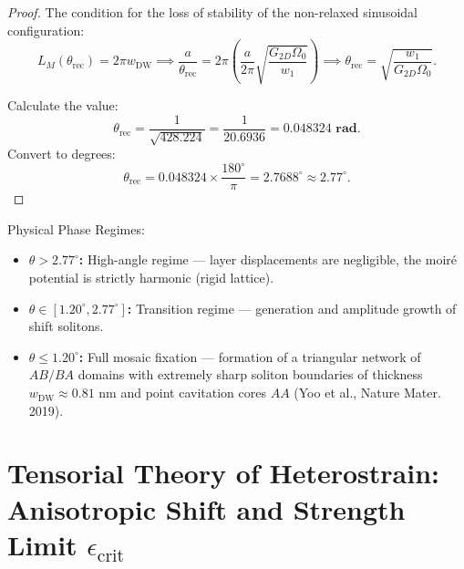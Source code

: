 \documentclass[12pt,a4paper]{article}
\begin{document}
				\begin{proof}
					The condition for the loss of stability of the non-relaxed sinusoidal configuration:
					\begin{equation}
						L_M(\theta_{\text{rec}}) = 2\pi w_{\text{DW}} \implies \frac{a}{\theta_{\text{rec}}} = 2\pi \left( \frac{a}{2\pi} \sqrt{\frac{G_{2D} \Omega_0}{w_1}} \right) \implies \theta_{\text{rec}} = \sqrt{\frac{w_1}{G_{2D} \Omega_0}}.
					\end{equation}
					
					Calculate the value:
					\begin{equation}
						\theta_{\text{rec}} = \frac{1}{\sqrt{428.224}} = \frac{1}{20.6936} = \mathbf{0.048324\text{ rad}}.
					\end{equation}
					Convert to degrees:
					\begin{equation}
						\theta_{\text{rec}} = 0.048324 \times \frac{180^\circ}{\pi} = \mathbf{2.7688^\circ} \approx \mathbf{2.77^\circ}.
					\end{equation}
				\end{proof}
				
				Physical Phase Regimes:
				\begin{itemize}
					\item \textbf{$\theta > 2.77^\circ$:} High-angle regime — layer displacements are negligible, the moiré potential is strictly harmonic (rigid lattice).
					\item \textbf{$\theta \in [1.20^\circ, 2.77^\circ]$:} Transition regime — generation and amplitude growth of shift solitons.
					\item \textbf{$\theta \le 1.20^\circ$:} Full mosaic fixation — formation of a triangular network of $AB/BA$ domains with extremely sharp soliton boundaries of thickness $w_{\text{DW}} \approx 0.81\text{ nm}$ and point cavitation cores $AA$ (Yoo et al., Nature Mater. 2019).
				\end{itemize}
				
				\section{Tensorial Theory of Heterostrain: Anisotropic Shift and Strength Limit $\epsilon_{\mathrm{crit}}$}
				
\end{document}
